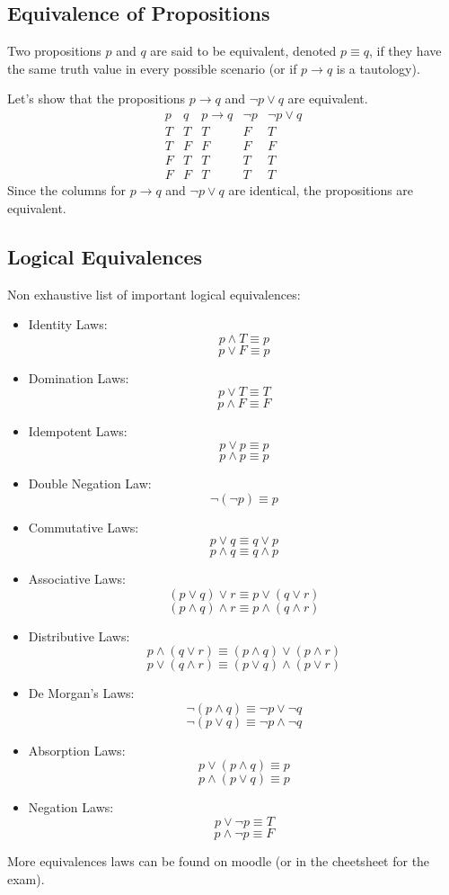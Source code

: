 \subsection{Equivalence of Propositions}
\begin{definition}
    Two propositions \(p\) and \(q\) are said to be equivalent, denoted \(p \equiv q\), if they have the same truth value in every possible scenario (or if $p \to q$ is a tautology).
\end{definition}

\begin{eg}
    Let's show that the propositions \(p \to q\) and \(\neg p \lor q\) are equivalent.
    \[
        \begin{array}{c|c|c|c|c}
            p & q & p \to q & \neg p & \neg p \lor q \\
            \hline
            T & T & T & F & T \\
            T & F & F & F & F \\
            F & T & T & T & T \\
            F & F & T & T & T
        \end{array}
    \]
    Since the columns for \(p \to q\) and \(\neg p \lor q\) are identical, the propositions are equivalent.
\end{eg}

\subsection{Logical Equivalences}
Non exhaustive list of important logical equivalences:
\begin{itemize}[itemsep=1pt,label=$\circ$]
    \item Identity Laws:
    \[ p \land T \equiv p \]
    \[ p \lor F \equiv p \]
    \item Domination Laws:
    \[ p \lor T \equiv T \]
    \[ p \land F \equiv F \]
    \item Idempotent Laws:
    \[ p \lor p \equiv p \]
    \[ p \land p \equiv p \]
    \item Double Negation Law:
    \[ \neg (\neg p) \equiv p \]
    \item Commutative Laws:
    \[ p \lor q \equiv q \lor p \]
    \[ p \land q \equiv q \land p \]
    \item Associative Laws:
    \[ (p \lor q) \lor r \equiv p \lor (q \lor r) \]
    \[ (p \land q) \land r \equiv p \land (q \land r) \]
    \item Distributive Laws:
    \[ p \land (q \lor r) \equiv (p \land q) \lor (p \land r) \]
    \[ p \lor (q \land r) \equiv (p \lor q) \land (p \lor r) \]
    \item De Morgan's Laws:
    \[ \neg (p \land q) \equiv \neg p \lor \neg q \]
    \[ \neg (p \lor q) \equiv \neg p \land \neg q \]
    \item Absorption Laws:
    \[ p \lor (p \land q) \equiv p \]
    \[ p \land (p \lor q) \equiv p \]
    \item Negation Laws:
    \[ p \lor \neg p \equiv T \]
    \[ p \land \neg p \equiv F \]
\end{itemize}
More equivalences laws can be found on moodle (or in the cheetsheet for the exam).

